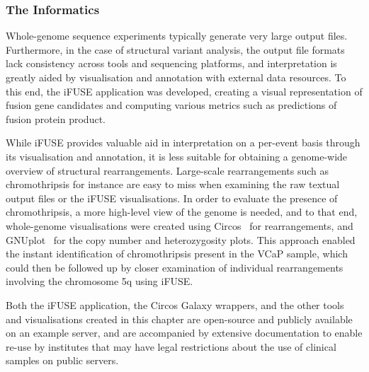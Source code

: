 




\subsubsection{The Informatics}
Whole-genome sequence experiments typically generate very large output files. Furthermore, in the case of structural variant analysis, the output file formats lack consistency across tools and sequencing platforms, and interpretation is greatly aided by visualisation and annotation with external data resources. To this end, the iFUSE application was developed, creating a visual representation of fusion gene candidates and computing various metrics such as predictions of fusion protein product.

While iFUSE provides valuable aid in interpretation on a per-event basis through its visualisation and annotation, it is less suitable for obtaining a genome-wide overview of structural rearrangements. Large-scale rearrangements such as chromothripsis for instance are easy to miss when examining the raw textual output files or the iFUSE visualisations. In order to evaluate the presence of chromothripsis, a more high-level view of the genome is needed, and to that end, whole-genome visualisations were created using Circos~\cite{circos} for rearrangements, and GNUplot~\cite{url-gnuplot} for the copy number and heterozygosity plots. This approach enabled the instant identification of chromothripsis present in the VCaP sample, which could then be followed up by closer examination of individual rearrangements involving the chromosome 5q using iFUSE.

Both the iFUSE application, the Circos Galaxy wrappers, and the other tools and visualisations created in this chapter are open-source and publicly available on an example server, and are accompanied by extensive documentation to enable re-use by institutes that may have legal restrictions about the use of clinical samples on public servers.

